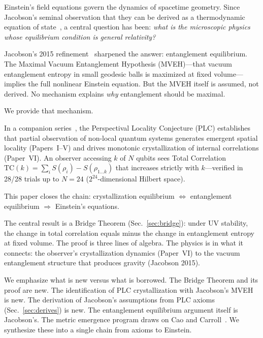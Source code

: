 \documentclass[aps,pra,twocolumn,superscriptaddress,floatfix]{revtex4-2}
\begin{document}
Einstein's field equations govern the dynamics of spacetime geometry.
Since Jacobson's seminal observation that they can be derived as a thermodynamic equation of state~\cite{jacobson1995}, a central question has been: \emph{what is the microscopic physics whose equilibrium condition is general relativity?}

Jacobson's 2015 refinement~\cite{jacobson2015} sharpened the answer: entanglement equilibrium.
The Maximal Vacuum Entanglement Hypothesis (MVEH)---that vacuum entanglement entropy in small geodesic balls is maximized at fixed volume---implies the full nonlinear Einstein equation.
But the MVEH itself is assumed, not derived.
No mechanism explains \emph{why} entanglement should be maximal.

We provide that mechanism.

In a companion series~\cite{glass2026plc1,glass2026plc2,glass2026plc3,glass2026plc4,glass2026plc5,glass2026plc6}, the Perspectival Locality Conjecture (PLC) establishes that partial observation of non-local quantum systems generates emergent spatial locality (Papers~I--V) and drives monotonic crystallization of internal correlations (Paper~VI).
An observer accessing $k$ of $N$ qubits sees Total Correlation $\mathrm{TC}(k) = \sum_i S(\rho_i) - S(\rho_{1\ldots k})$ that increases strictly with $k$---verified in 28/28 trials up to $N = 24$ ($2^{24}$-dimensional Hilbert space).

This paper closes the chain: crystallization equilibrium $\Leftrightarrow$ entanglement equilibrium $\Rightarrow$ Einstein's equations.

The central result is a Bridge Theorem (Sec.~\ref{sec:bridge}): under UV stability, the change in total correlation equals minus the change in entanglement entropy at fixed volume.
The proof is three lines of algebra.
The physics is in what it connects: the observer's crystallization dynamics (Paper~VI) to the vacuum entanglement structure that produces gravity (Jacobson 2015).

We emphasize what is new versus what is borrowed.
The Bridge Theorem and its proof are new.
The identification of PLC crystallization with Jacobson's MVEH is new.
The derivation of Jacobson's assumptions from PLC axioms (Sec.~\ref{sec:derives}) is new.
The entanglement equilibrium argument itself is Jacobson's.
The metric emergence program draws on Cao and Carroll~\cite{cao2018}.
We synthesize these into a single chain from axioms to Einstein.


\end{document}
